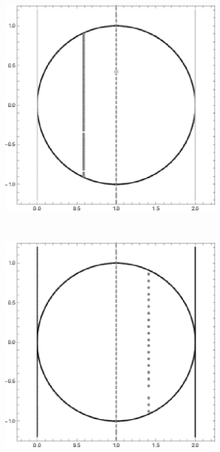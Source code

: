 \documentclass[a4paper]{article}
\begin{document}

\begin{figure}
    \centering
    \begin{subfigure}[b]{0.3\textwidth}
        \includegraphics[width=\textwidth]{right_angle_a}
        \label{fig:right_angle_a}
    \end{subfigure}
    ~ %
    \begin{subfigure}[b]{0.3\textwidth}
        \includegraphics[width=\textwidth]{right_angle_b}

\end{subfigure}
\end{figure}
\end{document}
